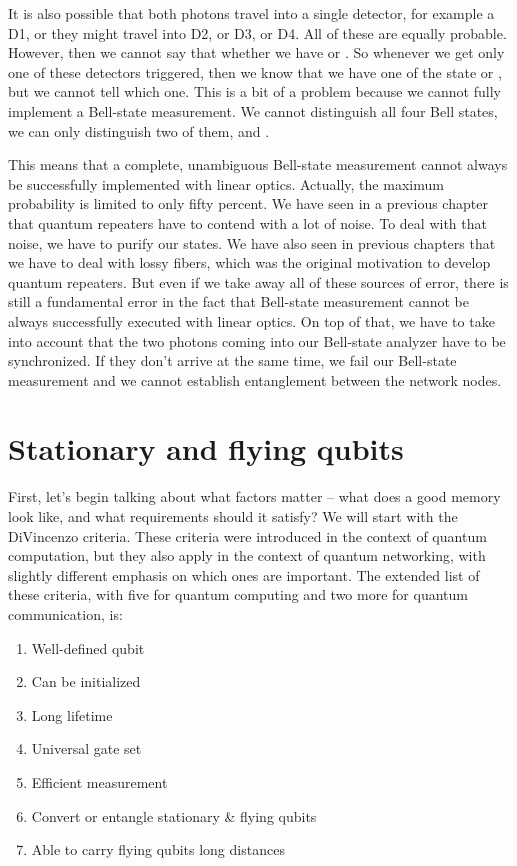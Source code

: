 It is also possible that both photons travel into a single detector, for example a D1, or they might travel into D2, or D3, or D4. All of these are equally probable. However, then we cannot say that whether we have \ket{\Phi^+} or \ket{\Phi^-}. So whenever we get only one of these detectors triggered, then we know that we have one of the state \ket{\Psi^+} or \ket{\Psi^-}, but we cannot tell which one. This is a bit of a problem because we cannot fully implement a Bell-state measurement. We cannot distinguish all four Bell states, we can only distinguish two of them, \ket{\Psi^+} and \ket{\Psi^-}.


This means that a complete, unambiguous Bell-state measurement cannot always be successfully implemented with linear optics. Actually, the maximum probability is limited to only fifty percent. We have seen in a previous chapter that quantum repeaters have to contend with a lot of noise. To deal with that noise, we have to purify our states. We have also seen in previous chapters that we have to deal with lossy fibers, which was the original motivation to develop quantum repeaters. But even if we take away all of these sources of error, there is still a fundamental error in the fact that Bell-state measurement cannot be always successfully executed with linear optics. On top of that, we have to take into account that the two photons coming into our Bell-state analyzer have to be synchronized. If they don't arrive at the same time, we fail our Bell-state measurement and we cannot establish entanglement between the network nodes.



\section{Stationary and flying qubits}

First, let's begin talking about what factors matter -- what does a good memory look like, and what requirements should it satisfy?  We will start with the DiVincenzo criteria. These criteria were introduced in the context of quantum computation, but they also apply in the context of quantum networking, with slightly different emphasis on which ones are important.  The extended list of these criteria, with five for quantum computing and two more for quantum communication, is:

\begin{enumerate}
    \item Well-defined qubit
    \item Can be initialized
    \item Long lifetime
    \item Universal gate set
    \item Efficient measurement
    \item Convert or entangle stationary \& flying qubits
    \item Able to carry flying qubits long distances
\end{enumerate}

